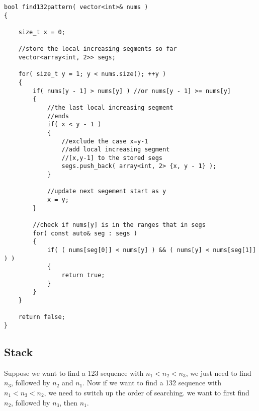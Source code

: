 \begin{lstlisting}[style=customc, caption={Search Intervals}]
bool find132pattern( vector<int>& nums )
{

    size_t x = 0;

    //store the local increasing segments so far
    vector<array<int, 2>> segs;

    for( size_t y = 1; y < nums.size(); ++y )
    {
        if( nums[y - 1] > nums[y] ) //or nums[y - 1] >= nums[y]
        {
            //the last local increasing segment
            //ends
            if( x < y - 1 )
            {
                //exclude the case x=y-1
                //add local increasing segment
                //[x,y-1] to the stored segs
                segs.push_back( array<int, 2> {x, y - 1} );
            }

            //update next segement start as y
            x = y;
        }

        //check if nums[y] is in the ranges that in segs
        for( const auto& seg : segs )
        {
            if( ( nums[seg[0]] < nums[y] ) && ( nums[y] < nums[seg[1]] ) )
            {
                return true;
            }
        }
    }

    return false;
}
\end{lstlisting}

 

\subsection{Stack}
Suppose we want to find a 123 sequence with $n_1 < n_2 < n_3$, we just need to find $n_3$, followed by $n_2$ and $n_1$. Now if we want to find a 132 sequence with $n_1 < n_3 < n_2$, we need to switch up the order of searching. we want to first find $n_2$, followed by $n_3$, then $n_1$.

